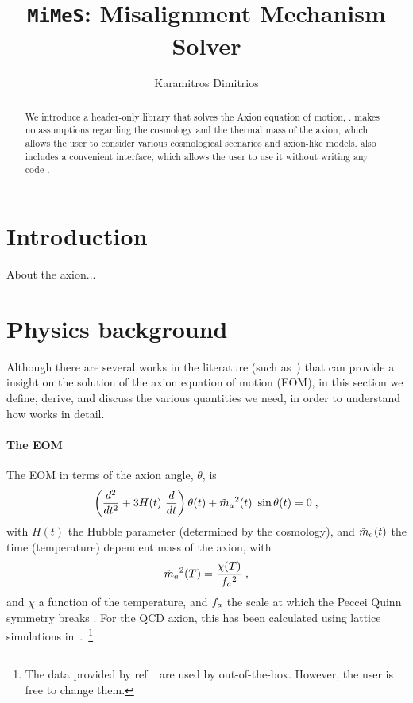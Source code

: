 \documentclass[11pt,a4paper]{article}
\author[ ]{Karamitros Dimitrios}
\affil[ ]{\em School of Physics and Astronomy, The University of Manchester,
	Manchester M13 9PL, United Kingdom}
\affil[ ]{\textit{E-mail: } \href{mailto:dimitrios.karamitros@manchester.ac.uk}{\color{blue}{dimitrios.karamitros@manchester.ac.uk}}}
\title{{\tt MiMeS}: Misalignment Mechanism Solver}
\begin{document}
\maketitle

\begin{abstract}
	We introduce a \CPP header-only library that solves the Axion equation of motion, \mimes.  
	\mimes makes no assumptions regarding the cosmology and the thermal mass of the axion, which allows the user 
	to consider various cosmological scenarios and axion-like models.
	\mimes also includes a convenient \PY interface, which allows the user to use it without writing any code \CPP.
\end{abstract}


\section{Introduction}\label{sec:intro}
\setcounter{equation}{0}

About the axion...

\section{Physics background}\label{sec:abundance}
\setcounter{equation}{0}
%
Although there are several works in the literature (such as~\cite{Chang:1998ys}) that can provide a insight on the solution of the axion equation of motion (EOM), in this section we define, derive, and discuss the various quantities we need, in order to understand how \mimes works in detail.

\paragraph{The EOM} %
%
%
The EOM in terms of the axion angle, $\theta$, is 
%
\begin{equation}
	\lrb{\dfrac{d^2}{d t^2} + 3 H(t) \ \dfrac{d}{d t} } \theta(t) + \maT^2(t) \ \sin \theta(t) = 0 \; ,
	\label{eq:eom}
\end{equation}
%
with $H(t)$ the Hubble parameter (determined by the cosmology), and $\tilde m_{a}{}(t)$  the time (temperature) dependent mass of the axion, with 
\begin{equation}
	\tilde m_{a}{}^2(T) = \dfrac{\chi(T)}{f_{a}{}^2}\;,
	\label{eq:axion_mass_def}
\end{equation} 
%
and $\chi$ a function of the temperature, and $f_{a}{}$ the scale at which the Peccei Quinn symmetry breaks . For the QCD axion, this has been calculated using lattice simulations in~\cite{Borsanyi:2016ksw}.~\footnote{The data provided by ref.~\cite{Borsanyi:2016ksw} are used by  \mimes out-of-the-box. However, the user is free to change them.}
\end{document}
